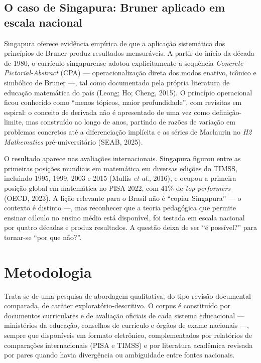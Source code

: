 \documentclass[12pt,a4paper,oneside]{article}
\begin{document}
\subsection{O caso de Singapura: Bruner aplicado em escala nacional}
\label{sec:singapura}

Singapura oferece evidência empírica de que a aplicação sistemática dos
princípios de Bruner produz resultados mensuráveis. A partir do início
da década de 1980, o currículo singapurense adotou explicitamente a
sequência \emph{Concrete-Pictorial-Abstract} (CPA) --- operacionalização
direta dos modos enativo, icônico e simbólico de Bruner ---, tal como
documentado pela própria literatura de educação matemática do país
(Leong; Ho; Cheng, 2015). O princípio operacional ficou conhecido como
``menos tópicos, maior profundidade'', com revisitas em espiral: o
conceito de derivada não é apresentado de uma vez como definição-limite,
mas construído ao longo de anos, partindo de razões de variação em
problemas concretos até a diferenciação implícita e as séries de
Maclaurin no \emph{H2 Mathematics} pré-universitário (SEAB, 2025).

O resultado aparece nas avaliações internacionais. Singapura figurou
entre as primeiras posições mundiais em matemática em diversas edições do
TIMSS, incluindo 1995, 1999, 2003 e 2015 (Mullis \emph{et al.}, 2016), e
ocupou a primeira posição global em matemática no PISA 2022, com 41\% de
\emph{top performers} (OECD, 2023). A lição relevante para o Brasil não é
``copiar Singapura'' --- o contexto é distinto ---, mas reconhecer que a
teoria pedagógica que permite ensinar cálculo no ensino médio está
disponível, foi testada em escala nacional por quatro décadas e produz
resultados. A questão deixa de ser ``é possível?'' para tornar-se ``por
que não?''.

\section{Metodologia}

Trata-se de uma pesquisa de abordagem qualitativa, do tipo revisão
documental comparada, de caráter exploratório-descritivo. O corpus é
constituído por documentos curriculares e de avaliação oficiais de cada
sistema educacional --- ministérios da educação, conselhos de currículo e
órgãos de exame nacionais ---, sempre que disponíveis em formato
eletrônico, complementados por relatórios de comparações internacionais
(PISA e TIMSS) e por literatura acadêmica revisada por pares quando havia
divergência ou ambiguidade entre fontes nacionais.
\end{document}
